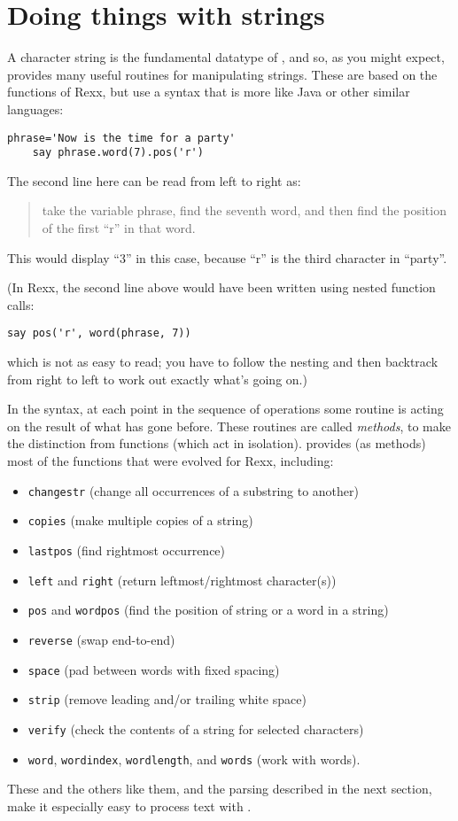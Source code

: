 \section{Doing things with strings}
A character string is the fundamental datatype of \nr{}, and so, as
you might expect, \nr{} provides many useful routines for
manipulating strings. These are based on the functions of Rexx, but
use a syntax that is more like Java or other similar languages:
\begin{lstlisting}[label=strings,caption=Strings]
    phrase='Now is the time for a party'
    say phrase.word(7).pos('r')
\end{lstlisting}
The second line here can be read from left to right as:
\begin{quote}take the variable phrase, find the seventh word, and then find the position of
the first “r” in that word.\end{quote}
This would display “3” in this case, because “r” is the third character in “party”.

(In Rexx, the second line above would have been written using nested
function calls:
\begin{lstlisting}[label=nested,caption=Rexx: Nested]
    say pos('r', word(phrase, 7))
\end{lstlisting}
which is not as easy to read; you have to follow the nesting and then
backtrack from right to left to work out exactly what’s going on.)

In the \nr{} syntax, at each point in the sequence of operations
some routine is acting on the result of what has gone before. These
routines are called \emph{methods}, to make the distinction from functions
(which act in isolation). \nr{} provides (as methods) most of the
functions that were evolved for Rexx, including:
\begin{itemize}
\item \texttt{changestr} (change all occurrences of a substring to another)
\item \texttt{copies} (make multiple copies of a string)
\item \texttt{lastpos} (find rightmost occurrence)
\item \texttt{left} and \texttt{right} (return leftmost/rightmost character(s))
\item \texttt{pos} and \texttt{wordpos} (find the position of string or a word in a string)
\item \texttt{reverse} (swap end-to-end)
\item \texttt{space} (pad between words with fixed spacing)
\item \texttt{strip} (remove leading and/or trailing white space)
\item \texttt{verify} (check the contents of a string for selected characters)
\item \texttt{word}, \texttt{wordindex}, \texttt{wordlength}, and \texttt{words} (work with words).
\end{itemize}
These and the others like them, and the parsing described in the next section, make it especially easy to process text with \nr{}.
